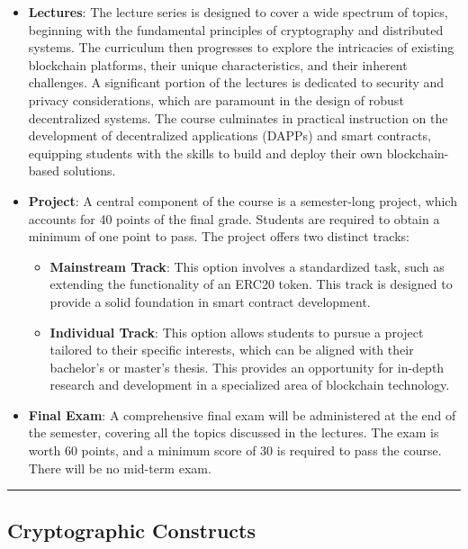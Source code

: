 \begin{itemize}
	\item
	\textbf{Lectures}: The lecture series is designed to cover a wide
	spectrum of topics, beginning with the fundamental principles of
	cryptography and distributed systems. The curriculum then progresses
	to explore the intricacies of existing blockchain platforms, their
	unique characteristics, and their inherent challenges. A significant
	portion of the lectures is dedicated to security and privacy
	considerations, which are paramount in the design of robust
	decentralized systems. The course culminates in practical instruction
	on the development of decentralized applications (DAPPs) and smart
	contracts, equipping students with the skills to build and deploy
	their own blockchain-based solutions.
	\item
	\textbf{Project}: A central component of the course is a semester-long
	project, which accounts for 40 points of the final grade. Students are
	required to obtain a minimum of one point to pass. The project offers
	two distinct tracks:
	
	\begin{itemize}
		\tightlist
		\item
		\textbf{Mainstream Track}: This option involves a standardized task,
		such as extending the functionality of an ERC20 token. This track is
		designed to provide a solid foundation in smart contract
		development.
		\item
		\textbf{Individual Track}: This option allows students to pursue a
		project tailored to their specific interests, which can be aligned
		with their bachelor's or master's thesis. This provides an
		opportunity for in-depth research and development in a specialized
		area of blockchain technology.
	\end{itemize}
	\item
	\textbf{Final Exam}: A comprehensive final exam will be administered
	at the end of the semester, covering all the topics discussed in the
	lectures. The exam is worth 60 points, and a minimum score of 30 is
	required to pass the course. There will be no mid-term exam.
\end{itemize}

\begin{center}\rule{0.5\linewidth}{0.5pt}\end{center}

\subsection{Cryptographic
	Constructs}\label{section-2-cryptographic-constructs}

